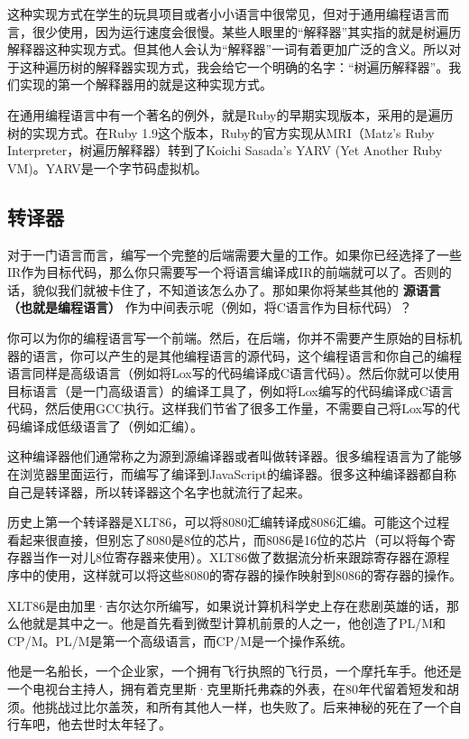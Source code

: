 \documentclass[cn,10pt,math=newtx,citestyle=gb7714-2015,bibstyle=gb7714-2015]{elegantbook}
\begin{document}
这种实现方式在学生的玩具项目或者小小语言中很常见，但对于通用编程语言而言，很少使用，因为运行速度会很慢。某些人眼里的“解释器”其实指的就是树遍历解释器这种实现方式。但其他人会认为“解释器”一词有着更加广泛的含义。所以对于这种遍历树的解释器实现方式，我会给它一个明确的名字：“树遍历解释器”。我们实现的第一个解释器用的就是这种实现方式。

\begin{tcolorbox}
在通用编程语言中有一个著名的例外，就是Ruby的早期实现版本，采用的是遍历树的实现方式。在Ruby 1.9这个版本，Ruby的官方实现从MRI（Matz’s Ruby Interpreter，树遍历解释器）转到了Koichi Sasada’s YARV (Yet Another Ruby VM)。YARV是一个字节码虚拟机。
\end{tcolorbox}

\subsection{转译器}

对于一门语言而言，编写一个完整的后端需要大量的工作。如果你已经选择了一些IR作为目标代码，那么你只需要写一个将语言编译成IR的前端就可以了。否则的话，貌似我们就被卡住了，不知道该怎么办了。那如果你将某些其他的 \textbf{源语言（也就是编程语言）} 作为中间表示呢（例如，将C语言作为目标代码）？

你可以为你的编程语言写一个前端。然后，在后端，你并不需要产生原始的目标机器的语言，你可以产生的是其他编程语言的源代码，这个编程语言和你自己的编程语言同样是高级语言（例如将Lox写的代码编译成C语言代码）。然后你就可以使用目标语言（是一门高级语言）的编译工具了，例如将Lox编写的代码编译成C语言代码，然后使用GCC执行。这样我们节省了很多工作量，不需要自己将Lox写的代码编译成低级语言了（例如汇编）。

这种编译器他们通常称之为源到源编译器或者叫做转译器。很多编程语言为了能够在浏览器里面运行，而编写了编译到JavaScript的编译器。很多这种编译器都自称自己是转译器，所以转译器这个名字也就流行了起来。

\begin{tcolorbox}
历史上第一个转译器是XLT86，可以将8080汇编转译成8086汇编。可能这个过程看起来很直接，但别忘了8080是8位的芯片，而8086是16位的芯片（可以将每个寄存器当作一对儿8位寄存器来使用）。XLT86做了数据流分析来跟踪寄存器在源程序中的使用，这样就可以将这些8080的寄存器的操作映射到8086的寄存器的操作。

XLT86是由加里·吉尔达尔所编写，如果说计算机科学史上存在悲剧英雄的话，那么他就是其中之一。他是首先看到微型计算机前景的人之一，他创造了PL/M和CP/M。PL/M是第一个高级语言，而CP/M是一个操作系统。

他是一名船长，一个企业家，一个拥有飞行执照的飞行员，一个摩托车手。他还是一个电视台主持人，拥有着克里斯·克里斯托弗森的外表，在80年代留着短发和胡须。他挑战过比尔盖茨，和所有其他人一样，也失败了。后来神秘的死在了一个自行车吧，他去世时太年轻了。
\end{tcolorbox}
\end{document}
